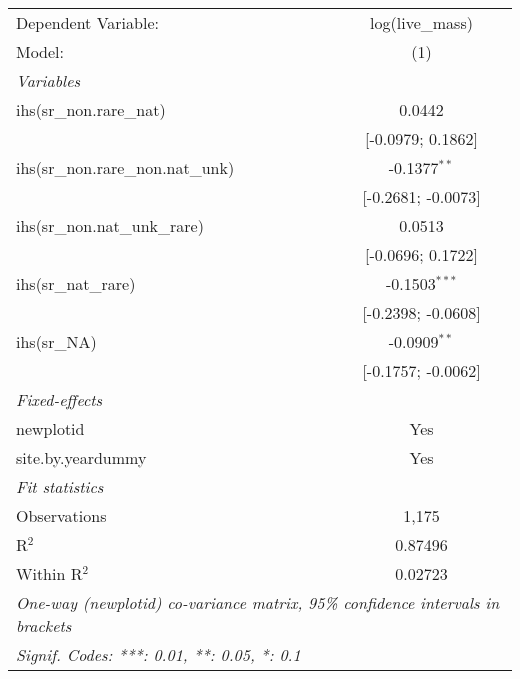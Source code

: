 \begin{tabular}{lc}
\tabularnewline\midrule\midrule
Dependent Variable:&log(live\_mass)\\
Model:&(1)\\
\midrule \emph{Variables}&  \\
ihs(sr\_non.rare\_nat)&0.0442\\
  &[-0.0979; 0.1862]\\
ihs(sr\_non.rare\_non.nat\_unk)&-0.1377$^{**}$\\
  &[-0.2681; -0.0073]\\
ihs(sr\_non.nat\_unk\_rare)&0.0513\\
  &[-0.0696; 0.1722]\\
ihs(sr\_nat\_rare)&-0.1503$^{***}$\\
  &[-0.2398; -0.0608]\\
ihs(sr\_NA)&-0.0909$^{**}$\\
  &[-0.1757; -0.0062]\\
\midrule \emph{Fixed-effects}&  \\
newplotid & Yes\\
site.by.yeardummy & Yes\\
\midrule \emph{Fit statistics}&  \\
Observations & 1,175\\
R$^2$ & 0.87496\\
Within R$^2$ & 0.02723\\
\midrule\midrule\multicolumn{2}{l}{\emph{One-way (newplotid) co-variance matrix, 95\% confidence intervals in brackets}}\\
\multicolumn{2}{l}{\emph{Signif. Codes: ***: 0.01, **: 0.05, *: 0.1}}\\
\end{tabular}


